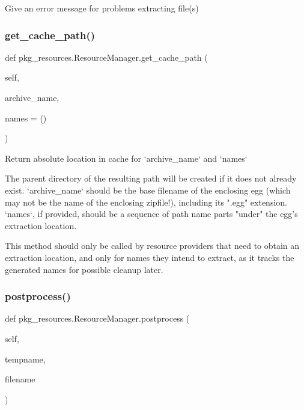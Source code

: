 \begin{DoxyVerb}Give an error message for problems extracting file(s)\end{DoxyVerb}
 \mbox{\label{classpkg__resources_1_1ResourceManager_a79de123f8cc5bf426ae33bd6b6b21e0c}} 
\subsubsection{\texorpdfstring{get\+\_\+cache\+\_\+path()}{get\_cache\_path()}}
{\footnotesize\ttfamily def pkg\+\_\+resources.\+Resource\+Manager.\+get\+\_\+cache\+\_\+path (\begin{DoxyParamCaption}\item[{}]{self,  }\item[{}]{archive\+\_\+name,  }\item[{}]{names = {\ttfamily ()} }\end{DoxyParamCaption})}

\begin{DoxyVerb}Return absolute location in cache for `archive_name` and `names`

The parent directory of the resulting path will be created if it does
not already exist.  `archive_name` should be the base filename of the
enclosing egg (which may not be the name of the enclosing zipfile!),
including its ".egg" extension.  `names`, if provided, should be a
sequence of path name parts "under" the egg's extraction location.

This method should only be called by resource providers that need to
obtain an extraction location, and only for names they intend to
extract, as it tracks the generated names for possible cleanup later.
\end{DoxyVerb}
 \mbox{\label{classpkg__resources_1_1ResourceManager_af459cd9904c680589c54e462b0e6cf4d}} 
\subsubsection{\texorpdfstring{postprocess()}{postprocess()}}
{\footnotesize\ttfamily def pkg\+\_\+resources.\+Resource\+Manager.\+postprocess (\begin{DoxyParamCaption}\item[{}]{self,  }\item[{}]{tempname,  }\item[{}]{filename }\end{DoxyParamCaption})}

